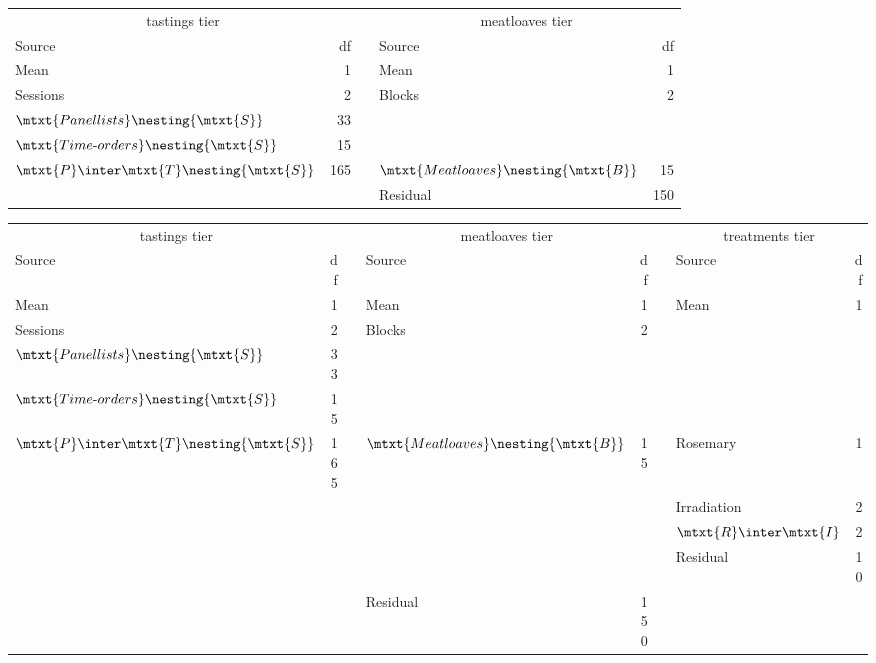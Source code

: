 \begin{center}
\begin{tabular}{lrclr}
\toprule
\multicolumn{2}{c}{tastings tier} & & \multicolumn{2}{c}{meatloaves tier}  \\
\cmidrule{1-2} \cmidrule{4-5}
Source & df & & Source & df  \\
\midrule
Mean & 1 & & Mean & 1 \\
\midrule
    Sessions & 2 & & Blocks & 2   \\
\midrule
     $\mtxt{Panellists}\nesting{\mtxt{S}}$ &33 & & &  \\
\midrule
     $\mtxt{Time\mbox{-}orders}\nesting{\mtxt{S}}$ &15 & & &   \\
\midrule
     $\mtxt{P}\inter\mtxt{T}\nesting{\mtxt{S}}$ &165 & &
$\mtxt{Meatloaves}\nesting{\mtxt{B}}$& 15  \\
& & & Residual & 150  \\
\bottomrule
\end{tabular}\end{center}

\begin{center}
\begin{tabular}{lrclrclr}
\toprule
\multicolumn{2}{c}{tastings tier} & & \multicolumn{2}{c}{meatloaves tier} & &
\multicolumn{2}{c}{treatments tier}  \\
\cmidrule{1-2} \cmidrule{4-5} \cmidrule{7-8}
Source & df & & Source & df & & Source & df  \\
\midrule
Mean & 1 & & Mean & 1 & & Mean & 1 \\
\midrule
     Sessions & 2 & & Blocks & 2 &  & &  \\
\midrule
     $\mtxt{Panellists}\nesting{\mtxt{S}}$ &33 & & & & &  &  \\
\midrule
     $\mtxt{Time\mbox{-}orders}\nesting{\mtxt{S}}$ &15 & & & & & &  \\
\midrule
     $\mtxt{P}\inter\mtxt{T}\nesting{\mtxt{S}}$ &165 & &
$\mtxt{Meatloaves}\nesting{\mtxt{B}}$& 15 & & Rosemary & 1 \\
 & & & & & & Irradiation & 2 \\
& & & & & & $\mtxt{R} \inter \mtxt{I}$ & 2  \\
       & & & & & & Residual & 10  \\
\cmidrule{4-8}
& & & Residual & 150 & & &  \\
\hline
\end{tabular}\end{center}


